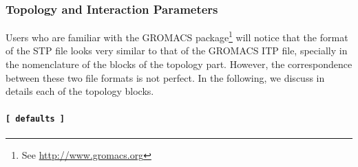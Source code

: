 \documentclass[10pt,a4paper,openany]{memoir}
\numberwithin{equation}{section}
\begin{document}
\subsubsection{Topology and Interaction Parameters}
\label{sec:stp-topology}

Users who are familiar with the GROMACS
package\footnote{See \url{http://www.gromacs.org}} will notice that the
format of the STP file looks very similar to that of the GROMACS ITP
file, specially in the nomenclature of the blocks of the topology
part. However, the correspondence between these two file formats is
not perfect. In the following, we discuss in details each of the
topology blocks.

\paragraph{\texttt{[~defaults~]}}
\end{document}
